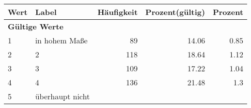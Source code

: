      \begin{longtable}{lXrrr}
     \toprule
     \textbf{Wert} & \textbf{Label} & \textbf{Häufigkeit} & \textbf{Prozent(gültig)} & \textbf{Prozent} \\
     \endhead
     \midrule
     \multicolumn{5}{l}{\textbf{Gültige Werte}}\\

     1 &
     \multicolumn{1}{X}{ in hohem Maße   } &


       \num{89} &
       \num[round-mode=places,round-precision=2]{14.06} &
         \num[round-mode=places,round-precision=2]{0.85} \\

     2 &
     \multicolumn{1}{X}{ 2   } &


       \num{118} &
       \num[round-mode=places,round-precision=2]{18.64} &
         \num[round-mode=places,round-precision=2]{1.12} \\

     3 &
     \multicolumn{1}{X}{ 3   } &


       \num{109} &
       \num[round-mode=places,round-precision=2]{17.22} &
         \num[round-mode=places,round-precision=2]{1.04} \\

     4 &
     \multicolumn{1}{X}{ 4   } &


       \num{136} &
       \num[round-mode=places,round-precision=2]{21.48} &
         \num[round-mode=places,round-precision=2]{1.3} \\

     5 &
     \multicolumn{1}{X}{ überhaupt nicht   } &



\end{longtable}

